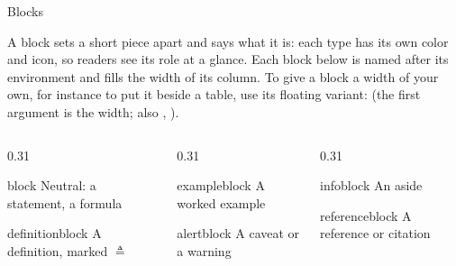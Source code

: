 
\begin{standardframe}{Blocks}
	{\small A block sets a short piece apart and says what it is: each type has
	its own color and icon, so readers see its role at a glance. Each block below
	is named after its environment and fills the width of its column. To give a
	block a width of your own, for instance to put it beside a table, use its floating
	variant:  (the first argument is the width; also , ).\par}
	\medskip
	\begin{columns}[t,onlytextwidth]
		\begin{column}{0.31\linewidth}
			\begin{block}{block}
				Neutral: a statement, a formula
			\end{block}
			\begin{definitionblock}{definitionblock}
				A definition, marked $\triangleq$
			\end{definitionblock}
		\end{column}
		\begin{column}{0.31\linewidth}
			\begin{exampleblock}{exampleblock}
				A worked example
			\end{exampleblock}
			\begin{alertblock}{alertblock}
				A caveat or a warning
			\end{alertblock}
		\end{column}
		\begin{column}{0.31\linewidth}
			\begin{infoblock}{infoblock}
				An aside
			\end{infoblock}
			\begin{referenceblock}{referenceblock}
				A reference or citation
			\end{referenceblock}
		\end{column}
	\end{columns}
\end{standardframe}
